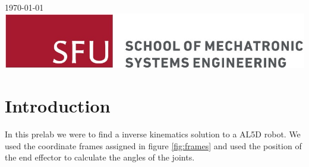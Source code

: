\documentclass[12pt]{article}
\begin{document}
\begin{titlepage}
{\large \today}\\[2cm] %


\includegraphics[scale=2.0]{MSE-Logo.jpg}\\[1cm] %

\vfill %

\end{titlepage}

\tableofcontents	%

\listoffigures
{}	%

 \listoftables

\lstlistoflistings
{}

\pagebreak
\setcounter{page}{1}	%
\setlength{\parskip}{1em}

\section{Introduction}
In this prelab we were to find a inverse kinematics solution to a AL5D robot. We used the coordinate frames assigned in figure \ref{fig:frames} and used the position of the end effector to calculate the angles of the joints.
\end{document}

